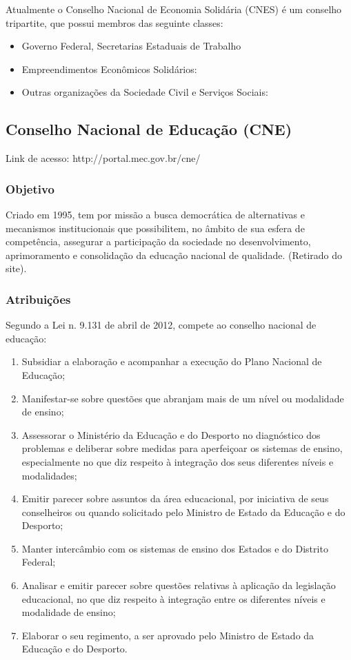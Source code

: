 Atualmente o Conselho Nacional de Economia Solidária (CNES) é um
conselho tripartite, que possui membros das seguinte classes:

\begin{itemize}
\item 
Governo Federal, Secretarias Estaduais de Trabalho
\item 
Empreendimentos Econômicos Solidários:
\item 
Outras organizações da Sociedade Civil e Serviços Sociais:
\end{itemize}
\newpage
\subsection*{Conselho Nacional de Educação (CNE)}

Link de acesso: http://portal.mec.gov.br/cne/


\subsubsection*{Objetivo}


Criado em 1995, tem por missão a busca democrática de alternativas e
mecanismos institucionais que possibilitem, no âmbito de sua esfera
de competência, assegurar a participação da sociedade no
desenvolvimento, aprimoramento e consolidação da educação
nacional de qualidade. (Retirado do site).


\subsubsection*{Atribuições}


Segundo a Lei n. 9.131 de abril de 2012, compete ao conselho nacional de
educação:

\begin{enumerate}
\item 
Subsidiar a elaboração e acompanhar a execução do Plano
Nacional de Educação;
\item 
Manifestar-se sobre questões que abranjam mais de um nível ou
modalidade de ensino;
\item 
Assessorar o Ministério da Educação e do Desporto no
diagnóstico dos problemas e deliberar sobre medidas para
aperfeiçoar os sistemas de ensino, especialmente no que diz
respeito à integração dos seus diferentes níveis e
modalidades;
\item 
Emitir parecer sobre assuntos da área educacional, por iniciativa de
seus conselheiros ou quando solicitado pelo Ministro de Estado da
Educação e do Desporto;
\item 
Manter intercâmbio com os sistemas de ensino dos Estados e do Distrito
Federal;
\item 
Analisar e emitir parecer sobre questões relativas à aplicação
da legislação educacional, no que diz respeito à
integração entre os diferentes níveis e modalidade de ensino;
\item 
Elaborar o seu regimento, a ser aprovado pelo Ministro de Estado da
Educação e do Desporto.
\end{enumerate}

